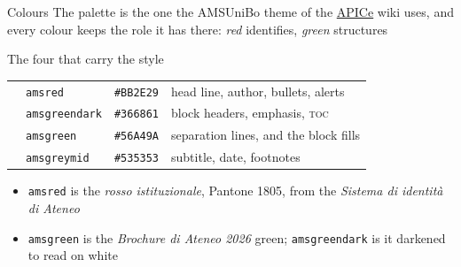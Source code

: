\documentclass[presentation,bologna,apice]{beamer}\mode<presentation>{\usetheme{AMSUniBo}}
\newcommand{\swatch}[1]{\fcolorbox{amsgreyline}{#1}{\rule{0pt}{1.3ex}\rule{2.2ex}{0pt}}}
\begin{document}
\begin{frame}[c]{Colours}
%
The palette is the one the \alert{AMSUniBo} theme of the
\href{https://apice.unibo.it/}{\textsf{APICe}} wiki uses, and every colour keeps the
role it has there: \textcolor{amsred}{\textit{red}} identifies,
\textcolor{amsgreendark}{\textit{green}} structures
%
\begin{exampleblock}{The four that carry the style}
\begin{tabular}{@{}llll@{}}
\swatch{amsred}       & \texttt{amsred}       & \texttt{\#BB2E29} & head line, author, bullets, alerts \\
\swatch{amsgreendark} & \texttt{amsgreendark} & \texttt{\#366861} & block headers, emphasis, \textsc{toc} \\
\swatch{amsgreen}     & \texttt{amsgreen}     & \texttt{\#56A49A} & separation lines, and the block fills \\
\swatch{amsgreymid}   & \texttt{amsgreymid}   & \texttt{\#535353} & subtitle, date, footnotes \\
\end{tabular}
\end{exampleblock}
%
\begin{itemize}
	\item \texttt{amsred} is the \emph{rosso istituzionale}, Pantone 1805, from the
	      \emph{Sistema di identità di Ateneo}
	\item \texttt{amsgreen} is the \emph{Brochure di Ateneo 2026} green;
	      \texttt{amsgreendark} is it darkened to read on white
\end{itemize}
%
\end{frame}
\end{document}
